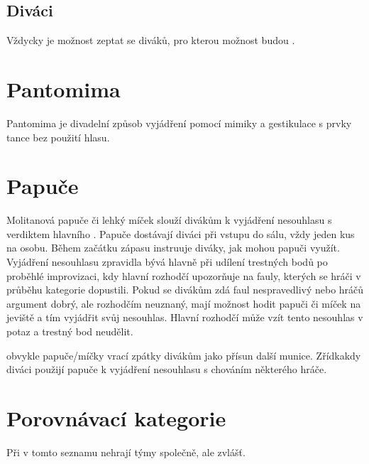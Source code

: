 \documentclass[main.tex]{subfiles}
\begin{document}
\subsection{ Diváci } Vždycky je možnost zeptat se diváků, pro kterou možnost budou . 
 
 
 
\needspace{5cm} \section{Pantomima} \label{pantomima} Pantomima je divadelní způsob vyjádření pomocí mimiky a gestikulace s prvky tance bez použití hlasu.  
 
 
 
\needspace{5cm} \section{Papuče} \label{papuče} Molitanová papuče či lehký míček slouží divákům k vyjádření nesouhlasu s verdiktem hlavního . Papuče dostávají diváci při vstupu do sálu, vždy jeden kus na osobu. Během začátku zápasu instruuje  diváky, jak mohou papuči využít. Vyjádření nesouhlasu zpravidla bývá hlavně při udílení trestných bodů po proběhlé improvizaci, kdy hlavní rozhodčí upozorňuje na fauly, kterých se hráči v průběhu kategorie dopustili. Pokud se divákům zdá faul nespravedlivý nebo hráčů argument dobrý, ale rozhodčím neuznaný, mají možnost hodit papuči či míček na jeviště a tím vyjádřit svůj nesouhlas. Hlavní rozhodčí může vzít tento nesouhlas v potaz a trestný bod neudělit. 
 
 obvykle papuče/míčky vrací zpátky divákům jako  přísun další munice.  
Zřídkakdy diváci použijí papuče k vyjádření nesouhlasu s chováním některého hráče. 
 
 
\needspace{5cm} \section{Porovnávací kategorie} \label{porovnávací kategorie} Při  v tomto seznamu nehrají týmy společně, ale zvlášť. 
 
\end{document}
